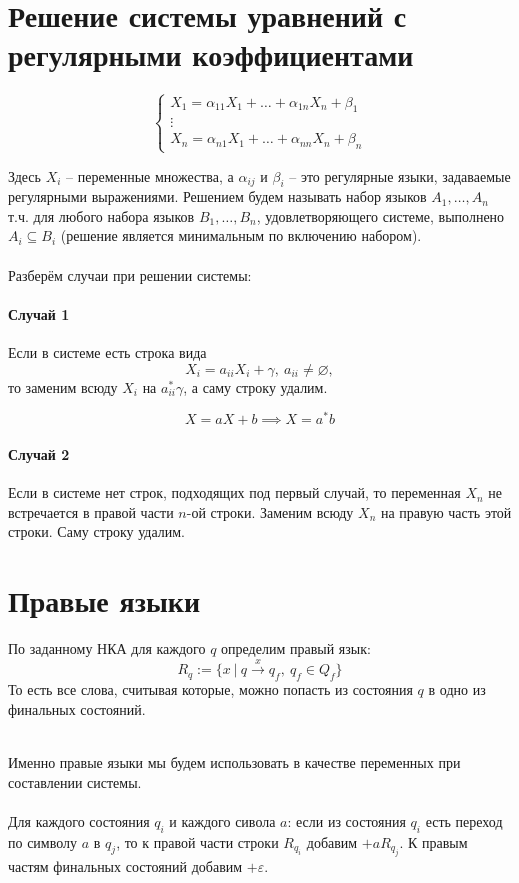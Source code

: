 \documentclass[11pt]{article}
\begin{document}
\section{Решение системы уравнений с регулярными коэффициентами}

\[\begin{cases}
    X_1 = \alpha_{11} X_1 + \dots + \alpha_{1n} X_n + \beta_1 \\
    \vdots \\
    X_n = \alpha_{n1} X_1 + \dots + \alpha_{nn} X_n + \beta_n
\end{cases}\]

Здесь $X_i$ -- переменные множества, а $\alpha_{ij}$ и $\beta_i$ -- 
это регулярные языки, задаваемые регулярными выражениями. Решением 
будем называть набор языков $A_1, \dots, A_n$ т.ч. для любого набора 
языков $B_1, \dots, B_n$, удовлетворяющего системе, выполнено $A_i 
\subseteq B_i$ (решение является минимальным по включению набором).
\\ \\ 
Разберём случаи при решении системы:

\paragraph{Случай 1}

Если в системе есть строка вида 
\[X_i = a_{ii} X_i + \gamma, \ a_{ii} \neq \varnothing,\]
то заменим всюду $X_i$ на $a_{ii}^* \gamma$, а саму строку удалим.

\begin{example}
    \[X = aX + b \implies X = a^* b\]
\end{example}

\paragraph{Случай 2}

Если в системе нет строк, подходящих под первый случай, то переменная 
$X_n$ не встречается в правой части $n \text{-ой}$ строки. Заменим 
всюду $X_n$ на правую часть этой строки. Саму строку удалим.

\section{Правые языки}

\begin{definition}
    По заданному НКА для каждого $q$ определим правый язык:
    \[R_q := \{x \ | \ q \xrightarrow{x} q_f, \ q_f \in Q_f\}\]
    То есть все слова, считывая которые, можно попасть из состояния 
    $q$ в одно из финальных состояний. 
\end{definition} \leavevmode
\\
Именно правые языки мы будем использовать в качестве переменных 
при составлении системы. \\ \\ 
Для каждого состояния $q_i$ и каждого сивола $a$: если из состояния 
$q_i$ есть переход по символу $a$ в $q_j$, то к правой части строки 
$R_{q_i}$ добавим $+aR_{q_j}$. К правым частям финальных состояний 
добавим $+ \varepsilon$.
\end{document}
